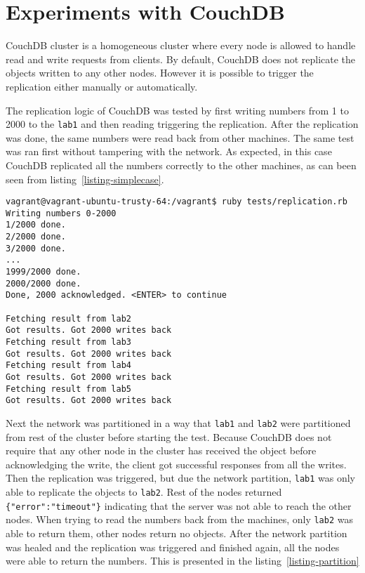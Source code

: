 \section{Experiments with CouchDB}

CouchDB cluster is a homogeneous cluster where every node is allowed to handle
read and write requests from clients. By default, CouchDB does not replicate the
objects written to any other nodes. However it is possible to trigger the
replication either manually or automatically.

The replication logic of CouchDB was tested by first writing numbers from 1 to
2000 to the \texttt{lab1} and then reading triggering the replication. After the
replication was done, the same numbers were read back from other machines. The
same test was ran first without tampering with the network. As expected, in this
case CouchDB replicated all the numbers correctly to the other machines, as can
been seen from listing~\ref{listing-simplecase}.

\begin{lstlisting}[caption={CouchDB replication without network anomalities},label={listing-simplecase}]
vagrant@vagrant-ubuntu-trusty-64:/vagrant$ ruby tests/replication.rb
Writing numbers 0-2000
1/2000 done.
2/2000 done.
3/2000 done.
...
1999/2000 done.
2000/2000 done.
Done, 2000 acknowledged. <ENTER> to continue

Fetching result from lab2
Got results. Got 2000 writes back
Fetching result from lab3
Got results. Got 2000 writes back
Fetching result from lab4
Got results. Got 2000 writes back
Fetching result from lab5
Got results. Got 2000 writes back
\end{lstlisting}

Next the network was partitioned in a way that \texttt{lab1} and \texttt{lab2}
were partitioned from rest of the cluster before starting the test. Because
CouchDB does not require that any other node in the cluster has received the
object before acknowledging the write, the client got successful responses from
all the writes. Then the replication was triggered, but due the network
partition, \texttt{lab1} was only able to replicate the objects to
\texttt{lab2}. Rest of the nodes returned \texttt{\{"error":"timeout"\}}
indicating that the server was not able to reach the other nodes. When trying to
read the numbers back from the machines, only \texttt{lab2} was able to return
them, other nodes return no objects. After the network partition was healed and the
replication was triggered and finished again, all the nodes were able to return
the numbers. This is presented in the listing~\ref{listing-partition}

